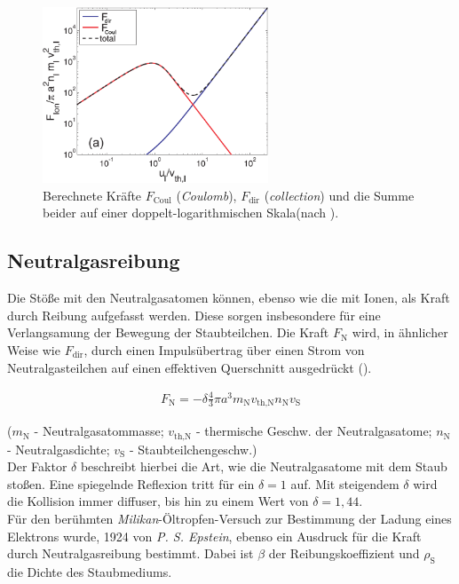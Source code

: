 \documentclass[numbers=noenddot,a4paper,notitlepage,twoside,BCOR15mm]{scrbook}
\newcommand{\ix}[1]{_\text{#1}}
\newcommand{\tilt}[1]{\textit{#1}}
\begin{document}
					\begin{figure}[!t]
						\centering
						\includegraphics[height=0.4\textwidth,width=0.6\textwidth]{figs/forcesandtrappingmelzer.png}
						\caption{Berechnete Kräfte $F\ix{Coul}$ (\tilt{Coulomb}), $F\ix{dir}$ (\tilt{collection}) und die Summe beider auf einer doppelt-logarithmischen Skala(nach \cite{Melzer12}).}
						\label{img:ionkräfte}
					\end{figure}

		\subsection{Neutralgasreibung}

			Die Stöße mit den Neutralgasatomen können, ebenso wie die mit Ionen, als Kraft durch Reibung aufgefasst werden. Diese sorgen insbesondere für eine Verlangsamung der Bewegung der Staubteilchen. Die Kraft $F\ix{N}$ wird, in ähnlicher Weise wie $F\ix{dir}$, durch einen Impulsübertrag über einen Strom von Neutralgasteilchen auf einen effektiven Querschnitt ausgedrückt (\cite{Epstein24}).

				\begin{align}
					F\ix{N}=-\delta\frac{4}{3}\pi a^3m\ix{N}v\ix{th,N}n\ix{N}v\ix{S}
				\end{align}

			($m\ix{N}$ - Neutralgasatommasse; $v\ix{th,N}$ - thermische Geschw. der Neutralgasatome; $n\ix{N}$ - Neutralgasdichte; $v\ix{S}$ - Staubteilchengeschw.)\\
			Der Faktor $\delta$ beschreibt hierbei die Art, wie die Neutralgasatome mit dem Staub stoßen. Eine spiegelnde Reflexion tritt für ein $\delta=1$ auf. Mit steigendem $\delta$ wird die Kollision immer diffuser, bis hin zu einem Wert von $\delta=1,44$.\\
			Für den berühmten \tilt{Milikan}-Öltropfen-Versuch zur Bestimmung der Ladung eines Elektrons wurde, 1924 von \tilt{P. S. Epstein}, ebenso ein Ausdruck für die Kraft durch Neutralgasreibung bestimmt. Dabei ist $\beta$ der Reibungskoeffizient und $\rho\ix{S}$ die Dichte des Staubmediums.
\end{document}
